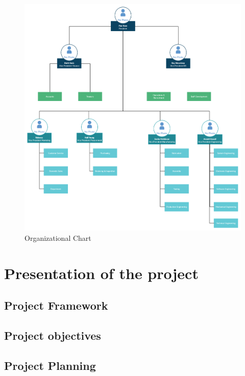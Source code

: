 \begin{figure}[H] 
    \centering
    \includegraphics[width=12cm]{Figures/Organizational_Chart.png}
    \caption{Organizational Chart}
\end{figure}










\section{Presentation of the project}


\subsection{Project Framework}



\subsection{Project objectives}





\subsection{Project Planning}


